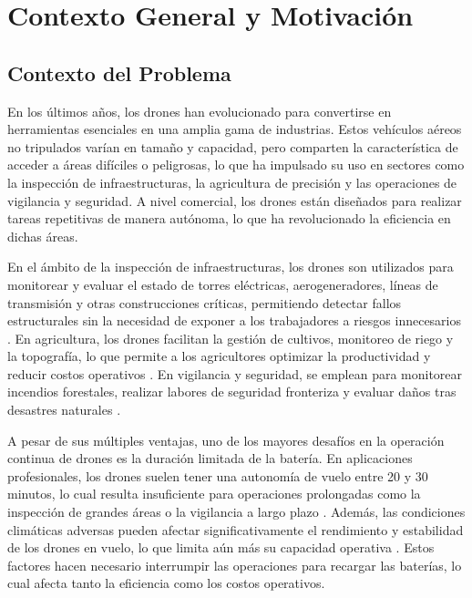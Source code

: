 
\section{Contexto General y Motivación}

\subsection{Contexto del Problema}

En los últimos años, los drones han evolucionado para convertirse en herramientas esenciales en una amplia gama de industrias. Estos vehículos aéreos no tripulados varían en tamaño y capacidad, pero comparten la característica de acceder a áreas difíciles o peligrosas, lo que ha impulsado su uso en sectores como la inspección de infraestructuras, la agricultura de precisión y las operaciones de vigilancia y seguridad. A nivel comercial, los drones están diseñados para realizar tareas repetitivas de manera autónoma, lo que ha revolucionado la eficiencia en dichas áreas.

En el ámbito de la inspección de infraestructuras, los drones son utilizados para monitorear y evaluar el estado de torres eléctricas, aerogeneradores, líneas de transmisión y otras construcciones críticas, permitiendo detectar fallos estructurales sin la necesidad de exponer a los trabajadores a riesgos innecesarios \cite{cite1}. En agricultura, los drones facilitan la gestión de cultivos, monitoreo de riego y la topografía, lo que permite a los agricultores optimizar la productividad y reducir costos operativos \cite{cite2}. En vigilancia y seguridad, se emplean para monitorear incendios forestales, realizar labores de seguridad fronteriza y evaluar daños tras desastres naturales \cite{cite3}.

A pesar de sus múltiples ventajas, uno de los mayores desafíos en la operación continua de drones es la duración limitada de la batería. En aplicaciones profesionales, los drones suelen tener una autonomía de vuelo entre 20 y 30 minutos, lo cual resulta insuficiente para operaciones prolongadas como la inspección de grandes áreas o la vigilancia a largo plazo \cite{cite4}. Además, las condiciones climáticas adversas pueden afectar significativamente el rendimiento y estabilidad de los drones en vuelo, lo que limita aún más su capacidad operativa \cite{cite5}. Estos factores hacen necesario interrumpir las operaciones para recargar las baterías, lo cual afecta tanto la eficiencia como los costos operativos.

